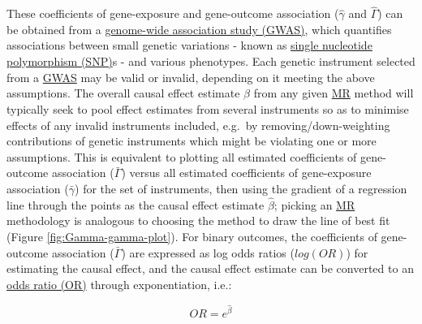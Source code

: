 \documentclass[
]{article}
\begin{document}
These coefficients of gene-exposure and gene-outcome association (\(\hat{\gamma}\) and \(\hat{\Gamma}\)) can be obtained from a \hyperref[acronyms_GWAS]{genome-wide association study (GWAS)}, which quantifies associations between small genetic variations - known as \hyperref[acronyms_SNP]{single nucleotide polymorphism (SNP)}s - and various phenotypes. Each genetic instrument selected from a \hyperref[acronyms_GWAS]{GWAS} may be valid or invalid, depending on it meeting the above assumptions. The overall causal effect estimate \(\hat{\beta}\) from any given \hyperref[acronyms_MR]{MR} method will typically seek to pool effect estimates from several instruments so as to minimise effects of any invalid instruments included, e.g.~by removing/down-weighting contributions of genetic instruments which might be violating one or more assumptions. This is equivalent to plotting all estimated coefficients of gene-outcome association (\(\bar{\Gamma}\)) versus all estimated coefficients of gene-exposure association (\(\bar{\gamma}\)) for the set of instruments, then using the gradient of a regression line through the points as the causal effect estimate \(\hat{\beta}\); picking an \hyperref[acronyms_MR]{MR} methodology is analogous to choosing the method to draw the line of best fit (Figure \ref{fig:Gamma-gamma-plot}). For binary outcomes, the coefficients of gene-outcome association (\(\bar{\Gamma}\)) are expressed as log odds ratios (\(log(OR)\)) for estimating the causal effect, and the causal effect estimate can be converted to an \hyperref[acronyms_OR]{odds ratio (OR)} through exponentiation, i.e.:

\begin{equation} 
OR = e^{\hat{\beta}}
\end{equation}
\end{document}

